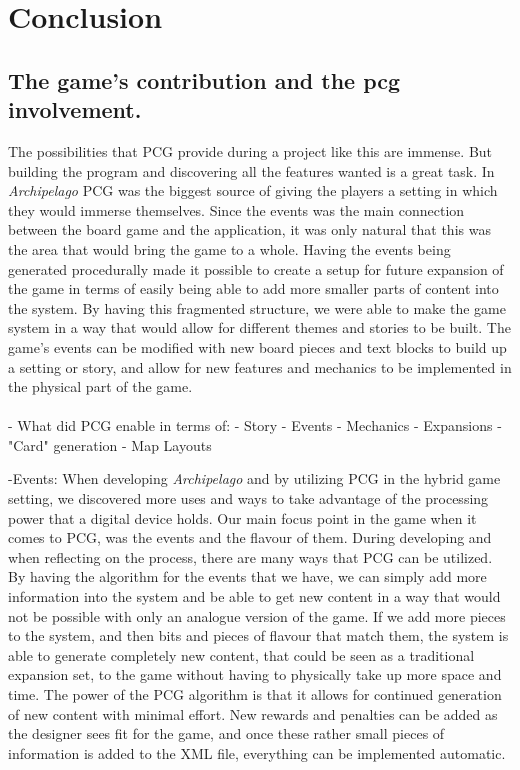 \chapter{Conclusion}
\section{The game's contribution and the pcg involvement. }

The possibilities that PCG provide during a project like this are immense. But building the program and discovering all the features wanted is a great task. In \textit{Archipelago} PCG was the biggest source of giving the players a setting in which they would immerse themselves. Since the events was the main connection between the board game and the application, it was only natural that this was the area that would bring the game to a whole. Having the events being generated procedurally made it possible to create a setup for future expansion of the game in terms of easily being able to add more smaller parts of content into the system. By having this fragmented structure, we were able to make the game system in a way that would allow for different themes and stories to be built. The game's events can be modified with new board pieces and text blocks to build up a setting or story, and allow for new features and mechanics to be implemented in the physical part of the game.\\\\

- What did PCG enable in terms of:
	- Story
	- Events
	- Mechanics
	- Expansions
	- "Card" generation
	- Map Layouts
	
-Events:
When developing \textit{Archipelago} and by utilizing PCG in the hybrid game setting, we discovered more uses and ways to take advantage of the processing power that a digital device holds. Our main focus point in the game when it comes to PCG, was the events and the flavour of them. During developing and when reflecting on the process, there are many ways that PCG can be utilized. By having the algorithm for the events that we have, we can simply add more information into the system and be able to get new content in a way that would not be possible with only an analogue version of the game. If we add more pieces to the system, and then bits and pieces of flavour that match them, the system is able to generate completely new content, that could be seen as a traditional expansion set, to the game without having to physically take up more space and time. The power of the PCG algorithm is that it allows for continued generation of new content with minimal effort. New rewards and penalties can be added as the designer sees fit for the game, and once these rather small pieces of information is added to the XML file, everything can be implemented automatic. 




